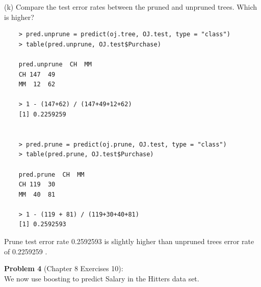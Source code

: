 \documentclass{article}
\begin{document}
(k) Compare the test error rates between the pruned and unpruned trees. Which is higher?\\

\begin{program}
	\begin{verbatim}
	> pred.unprune = predict(oj.tree, OJ.test, type = "class")
	> table(pred.unprune, OJ.test$Purchase)
	
	pred.unprune  CH  MM
	CH 147  49
	MM  12  62
	
	> 1 - (147+62) / (147+49+12+62)
	[1] 0.2259259
	
	
	> pred.prune = predict(oj.prune, OJ.test, type = "class")
	> table(pred.prune, OJ.test$Purchase)
	
	pred.prune  CH  MM
	CH 119  30
	MM  40  81
	
	> 1 - (119 + 81) / (119+30+40+81)
	[1] 0.2592593
	\end{verbatim}
\end{program}

Prune test error rate 0.2592593 is slightly higher than unpruned trees error rate of 0.2259259 .



\newpage
{\bf Problem 4} (Chapter 8 Exercises 10):\\
We now use boosting to predict Salary in the Hitters data set.\\
\end{document}
